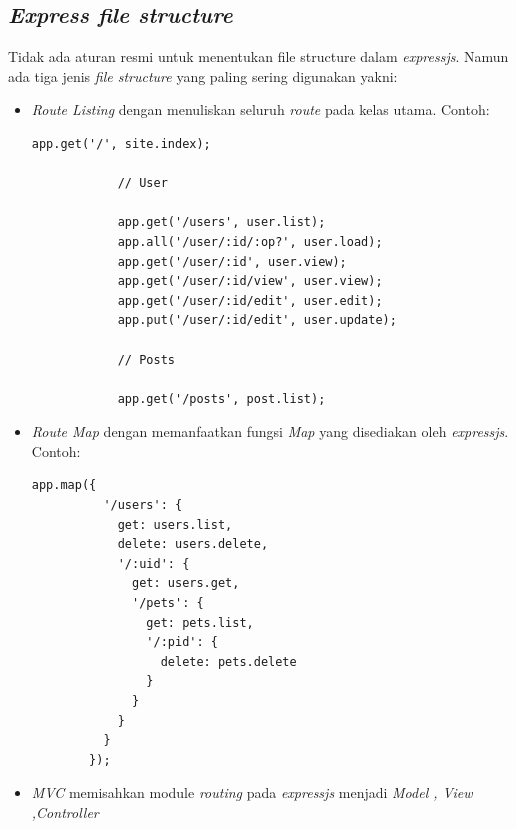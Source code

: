 \subsection{\textit{Express file structure }}
Tidak ada aturan resmi untuk menentukan file structure dalam \textit{expressjs}. Namun ada tiga jenis \textit{file structure} yang paling sering digunakan yakni\cite{express:02:FileStructure}:
\begin{itemize}
    \item \textit{Route Listing} dengan menuliskan seluruh \textit{route} pada kelas utama. Contoh:
    \begin{lstlisting}[]
            app.get('/', site.index);
            
            // User
            
            app.get('/users', user.list);
            app.all('/user/:id/:op?', user.load);
            app.get('/user/:id', user.view);
            app.get('/user/:id/view', user.view);
            app.get('/user/:id/edit', user.edit);
            app.put('/user/:id/edit', user.update);
            
            // Posts
            
            app.get('/posts', post.list);
\end{lstlisting}
\item \textit{Route Map} dengan memanfaatkan fungsi \textit{Map} yang disediakan oleh \textit{expressjs}. Contoh: 
    \begin{lstlisting}[]
        app.map({
          '/users': {
            get: users.list,
            delete: users.delete,
            '/:uid': {
              get: users.get,
              '/pets': {
                get: pets.list,
                '/:pid': {
                  delete: pets.delete
                }
              }
            }
          }
        });
\end{lstlisting}

\item \textit{MVC}  memisahkan module \textit{routing} pada \textit{expressjs} menjadi \textit{Model , View ,Controller} 


\end{itemize}

	
